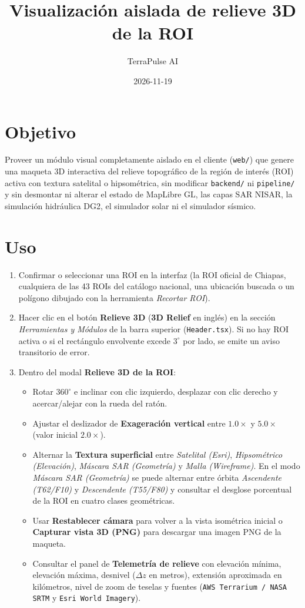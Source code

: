\documentclass[11pt,a4paper]{article}
\title{Visualizaci\'on aislada de relieve 3D de la ROI}
\author{TerraPulse AI}
\date{2026-11-19}
\begin{document}
\maketitle

\section{Objetivo}
Proveer un m\'odulo visual completamente aislado en el cliente (\texttt{web/}) que genere una maqueta 3D interactiva del relieve topogr\'afico de la regi\'on de inter\'es (ROI) activa con textura satelital o hipsom\'etrica, sin modificar \texttt{backend/} ni \texttt{pipeline/} y sin desmontar ni alterar el estado de MapLibre GL, las capas SAR NISAR, la simulaci\'on hidr\'aulica DG2, el simulador solar ni el simulador s\'ismico.

\section{Uso}
\begin{enumerate}
  \item Confirmar o seleccionar una ROI en la interfaz (la ROI oficial de Chiapas, cualquiera de las 43 ROIs del cat\'alogo nacional, una ubicaci\'on buscada o un pol\'igono dibujado con la herramienta \emph{Recortar ROI}).
  \item Hacer clic en el bot\'on \textbf{Relieve 3D} (\textbf{3D Relief} en ingl\'es) en la secci\'on \emph{Herramientas y M\'odulos} de la barra superior (\texttt{Header.tsx}). Si no hay ROI activa o si el rect\'angulo envolvente excede $3^\circ$ por lado, se emite un aviso transitorio de error.
  \item Dentro del modal \textbf{Relieve 3D de la ROI}:
  \begin{itemize}
    \item Rotar $360^\circ$ e inclinar con clic izquierdo, desplazar con clic derecho y acercar/alejar con la rueda del rat\'on.
    \item Ajustar el deslizador de \textbf{Exageraci\'on vertical} entre $1.0\times$ y $5.0\times$ (valor inicial $2.0\times$).
    \item Alternar la \textbf{Textura superficial} entre \emph{Satelital (Esri)}, \emph{Hipsom\'etrico (Elevaci\'on)}, \emph{M\'ascara SAR (Geometr\'ia)} y \emph{Malla (Wireframe)}. En el modo \emph{M\'ascara SAR (Geometr\'ia)} se puede alternar entre \'orbita \emph{Ascendente (T62/F10)} y \emph{Descendente (T55/F80)} y consultar el desglose porcentual de la ROI en cuatro clases geom\'etricas.
    \item Usar \textbf{Restablecer c\'amara} para volver a la vista isom\'etrica inicial o \textbf{Capturar vista 3D (PNG)} para descargar una imagen PNG de la maqueta.
    \item Consultar el panel de \textbf{Telemetr\'ia de relieve} con elevaci\'on m\'inima, elevaci\'on m\'axima, desnivel ($\Delta z$ en metros), extensi\'on aproximada en kil\'ometros, nivel de zoom de teselas y fuentes (\texttt{AWS Terrarium / NASA SRTM} y \texttt{Esri World Imagery}).
  \end{itemize}
\end{enumerate}
\end{document}
